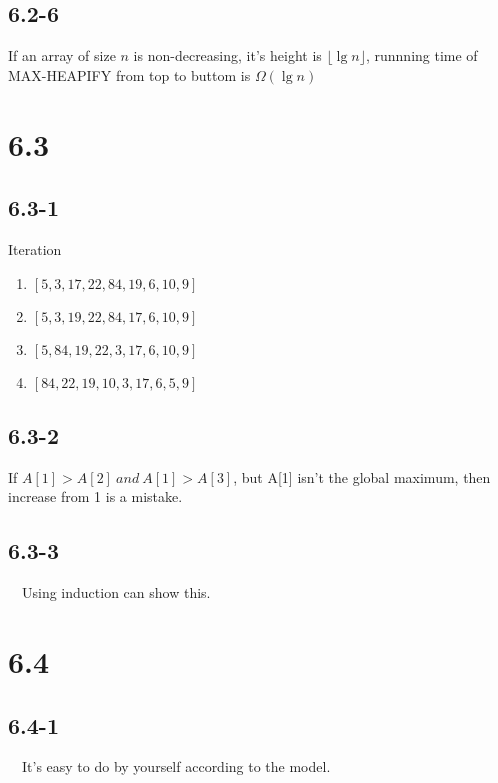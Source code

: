 \documentclass{article}
\begin{document}
\subsection*{6.2-6}
If an array of size $n$ is non-decreasing, it's height is
$\lfloor {\lg n} \rfloor$, runnning time of MAX-HEAPIFY from top to buttom is $\Omega(\lg n)$

\section*{6.3}
\subsection*{6.3-1}
Iteration
\begin{enumerate}
\item $[5, 3, 17, 22, 84, 19, 6, 10, 9]$
\item $[5, 3, 19, 22, 84, 17, 6, 10, 9]$
\item $[5, 84, 19, 22, 3, 17, 6, 10, 9]$
\item $[84, 22, 19, 10, 3, 17, 6, 5, 9]$
\end{enumerate}

\subsection*{6.3-2}
If $A[1] > A[2] ~and~ A[1] > A[3]$, but A[1] isn't the global maximum, then increase from 1 is a mistake.

\subsection*{6.3-3}
~~Using induction can show this.

\section*{6.4}
\subsection*{6.4-1}
~~It's easy to do by yourself according to the model.
\end{document}
